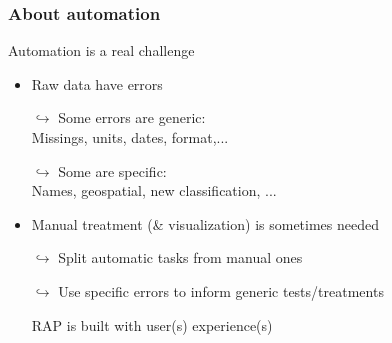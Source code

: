 \documentclass[xcolor=x11names,compress]{beamer}
\renewcommand{\(}{\begin{columns}}
\renewcommand{\)}{\end{columns}}
\newcommand{\<}[1]{\begin{column}{#1}}
\renewcommand{\>}{\end{column}}
\begin{document}
\begin{frame}
\frametitle{About automation}
Automation is a real challenge
\pause
 \begin{itemize}[<+->]
        \item Raw data have errors 
        \item[$\hookrightarrow$] Some errors are generic: \\
        Missings, units, dates, format,... 
        \item[$\hookrightarrow$] Some are specific: \\
        Names, geospatial, new classification, ...   
        \item Manual treatment (\& visualization) is sometimes needed
        \item[$\hookrightarrow$] Split automatic tasks from manual ones
        \item[$\hookrightarrow$] Use specific errors to inform generic tests/treatments 
        \item[]
        \begin{center}
          \textcolor{siap}{RAP is built with user(s) experience(s)}
        \end{center}
    \end{itemize}
\end{frame}
\end{document}
